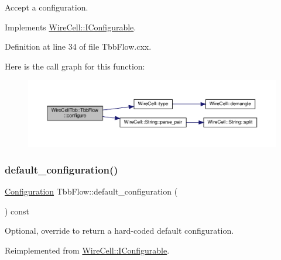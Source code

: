 Accept a configuration. 



Implements \hyperlink{class_wire_cell_1_1_i_configurable_a57ff687923a724093df3de59c6ff237d}{Wire\+Cell\+::\+I\+Configurable}.



Definition at line 34 of file Tbb\+Flow.\+cxx.

Here is the call graph for this function\+:
\nopagebreak
\begin{figure}[H]
\begin{center}
\leavevmode
\includegraphics[width=350pt]{class_wire_cell_tbb_1_1_tbb_flow_aad4ef0b553f5efdbe2558fad84373ab9_cgraph}
\end{center}
\end{figure}
\mbox{\label{class_wire_cell_tbb_1_1_tbb_flow_a8dacc14b5763a06f06e508aff481b9d2}} 
\subsubsection{\texorpdfstring{default\+\_\+configuration()}{default\_configuration()}}
{\footnotesize\ttfamily \hyperlink{namespace_wire_cell_a9f705541fc1d46c608b3d32c182333ee}{Configuration} Tbb\+Flow\+::default\+\_\+configuration (\begin{DoxyParamCaption}{ }\end{DoxyParamCaption}) const\hspace{0.3cm}{\ttfamily [virtual]}}



Optional, override to return a hard-\/coded default configuration. 



Reimplemented from \hyperlink{class_wire_cell_1_1_i_configurable_a54841b2da3d1ea02189478bff96f7998}{Wire\+Cell\+::\+I\+Configurable}.



